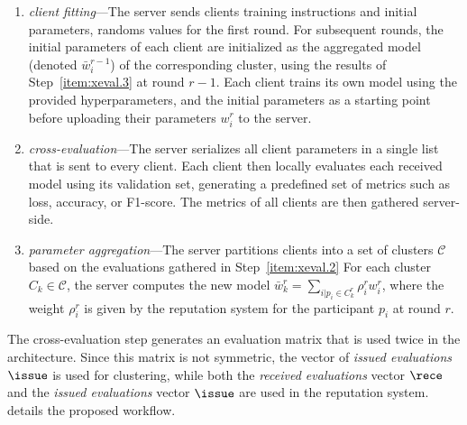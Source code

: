 \begin{enumerate}[1.]
  \item \emph{client fitting}---The server sends clients training instructions and initial parameters, \ie randoms values for the first round.
  For subsequent rounds, the initial parameters of each client are initialized as the aggregated model (denoted $\bar{w}_i^{r-1}$) of the corresponding cluster, using the results of Step~\ref{item:xeval.3} at round $r-1$.
  Each client trains its own model using the provided hyperparameters, and the initial parameters as a starting point before uploading their parameters $w_i^r$ to the server.
  \label{item:xeval.1}
  
  \item \emph{cross-evaluation}---The server serializes all client parameters in a single list that is sent to every client. 
  Each client then locally evaluates each received model using its validation set, generating a predefined set of metrics such as loss, accuracy, or F1-score.
  The metrics of all clients are then gathered server-side.
  \label{item:xeval.2}
  
  \item \emph{parameter aggregation}---The server partitions clients into a set of clusters $\mathscr{C}$ based on the evaluations gathered in Step~\ref{item:xeval.2}
  For each cluster $C_k \in \mathscr{C}$, the server computes the new model $\bar{w}_k^r = \sum_{i | p_i \in C_k^r} \rho_i^r w_i^r$, where the weight $\rho_i^r$ is given by the reputation system for the participant $p_i$ at round $r$.
  \label{item:xeval.3}

\end{enumerate}

The cross-evaluation step generates an evaluation matrix that is used twice in the architecture.
Since this matrix is not symmetric, the vector of \emph{issued evaluations} $\issue$ is used for clustering, while both the \emph{received evaluations} vector $\rece$ and the \emph{issued evaluations} vector $\issue$ are used in the reputation system. 
 details the proposed workflow.

